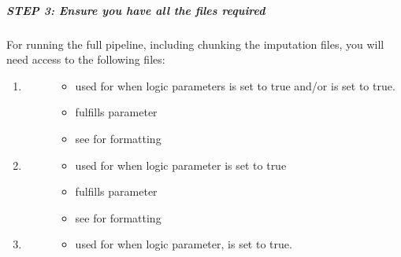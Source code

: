 \documentclass[letterpaper,10pt,english]{sphinxmanual}
\begin{document}
\subparagraph{STEP 3: Ensure you have all the files required}
\label{\detokenize{fullPipelineBinaryTutorial:step-3-ensure-you-have-all-the-files-required}}
For running the full pipeline, including chunking the imputation files, you will need access to the following files:
\begin{enumerate}
%
\item {} \begin{description}
\item[{}] \leavevmode\begin{itemize}
\item {} 
used for when logic parameters  is set to true and/or  is set to true.

\item {} 
fulfills parameter 

\item {} 
see {\hyperref[\detokenize{fileFormats:plink-file-format}]{}} for formatting

\end{itemize}

\end{description}

\item {} \begin{description}
\item[{}] \leavevmode\begin{itemize}
\item {} 
used for when logic parameter  is set to true

\item {} 
fulfills parameter 

\item {} 
see {\hyperref[\detokenize{fileFormats:phenotype-file-format}]{}} for formatting

\end{itemize}

\end{description}

\item {} \begin{description}
\item[{}] \leavevmode\begin{itemize}
\item {} 
used for when logic parameter,  is set to true.


\end{itemize}
\end{description}
\end{enumerate}
\end{document}
